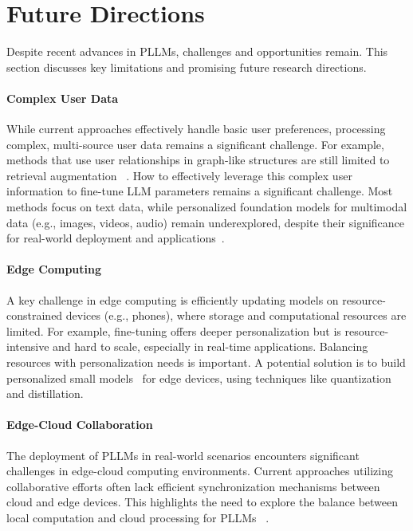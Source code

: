 \section{Future Directions}

Despite recent advances in PLLMs, challenges and opportunities remain. This section discusses key limitations and promising future research directions.

\paragraph{Complex User Data}
While current approaches effectively handle basic user preferences, processing complex, multi-source user data remains a significant challenge. For example, methods that use user relationships in graph-like structures are still limited to retrieval augmentation ~\citep{du2024perltqa}. How to effectively leverage this complex user information to fine-tune LLM parameters remains a significant challenge. 
Most methods focus on text data, while personalized foundation models for multimodal data (e.g., images, videos, audio) remain underexplored, despite their significance for real-world deployment and applications~\citep{wu2024personalized, pi2024personalized}.

\paragraph{Edge Computing} 
A key challenge in edge computing is efficiently updating models on resource-constrained devices (e.g., phones), where storage and computational resources are limited. For example, fine-tuning offers deeper personalization but is resource-intensive and hard to scale, especially in real-time applications. Balancing resources with personalization needs is important. 
A potential solution is to build personalized small models~\citep{lu2024small} for edge devices, using techniques like quantization and distillation.

\paragraph{Edge-Cloud Collaboration}
The deployment of PLLMs in real-world scenarios encounters significant challenges in edge-cloud computing environments. Current approaches utilizing collaborative efforts often lack efficient synchronization mechanisms between cloud and edge devices. This highlights the need to explore the balance between local computation and cloud processing for PLLMs ~\citep{tian2024edge}.


